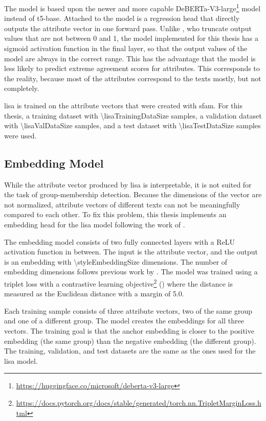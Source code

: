 The model is based upon the newer and more capable DeBERTa-V3-large\footnote{\url{https://huggingface.co/microsoft/deberta-v3-large}} model instead of t5-base. Attached to the model is a regression head that directly outputs the attribute vector in one forward pass. Unlike \citet{patelLearningInterpretableStyle2023}, who truncate output values that are not between \num{0} and \num{1}, the model implemented for this thesis has a sigmoid activation function in the final layer, so that the output values of the model are always in the correct range. This has the advantage that the model is less likely to predict extreme agreement scores for attributes. This corresponds to the reality, because most of the attributes correspond to the texts mostly, but not completely.

\ac{lisa} is trained on the attribute vectors that were created with \ac{sfam}. For this thesis, a training dataset with \num{\lisaTrainingDataSize} samples, a validation dataset with \num{\lisaValDataSize} samples, and a test dataset with \num{\lisaTestDataSize} samples were used.


\subsection{Embedding Model}
\label{sec:experiments:setup:embedder}
While the attribute vector produced by \ac{lisa} is interpretable, it is not suited for the task of group-membership detection. Because the dimensions of the vector are not normalized, attribute vectors of different texts can not be meaningfully compared to each other. To fix this problem, this thesis implements an embedding head for the \ac{lisa} model following the work of \citet{patelLearningInterpretableStyle2023}.

The embedding model consists of two fully connected layers with a ReLU activation function in between. The input is the attribute vector, and the output is an embedding with \num{\styleEmbeddingSize} dimensions. The number of embedding dimensions follows previous work by \citet{patelLearningInterpretableStyle2023}. The model was trained using a triplet loss with a contrastive learning objective\footnote{\url{https://docs.pytorch.org/docs/stable/generated/torch.nn.TripletMarginLoss.html}} (\cite{NEURIPS2020_d89a66c7}) where the distance is measured as the Euclidean distance with a margin of \num{5.0}.

Each training sample consists of three attribute vectors, two of the same group and one of a different group. The model creates the embeddings for all three vectors. The training goal is that the anchor embedding is closer to the positive embedding (the same group) than the negative embedding (the different group). The training, validation, and test datasets are the same as the ones used for the \ac{lisa} model.


